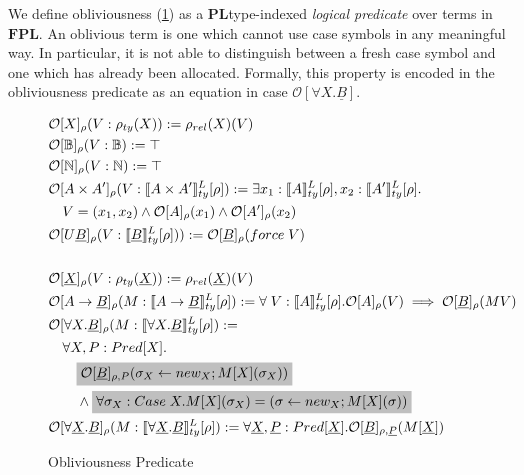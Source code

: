 \documentclass[acmsmall]{acmart}
\newcommand{\den}[1]{\llbracket #1\rrbracket}
\newcommand{\pl}{$\mathbf{PL}$}
\newcommand{\fpl}{$\mathbf{FPL}$}
\begin{document}
We define obliviousness (\cref{fig:Oblivious}) as a \pl\;type-indexed \textit{logical predicate} over terms in \fpl. An oblivious term is one which cannot use case symbols in any meaningful way. In particular, it is not able to distinguish between a fresh case symbol and one which has already been allocated. Formally, this property is encoded in the obliviousness predicate as an equation in case $\mathcal{O}[\forall X. \underline{B}]$.


\begin{figure}[H]
  \centering
  \scriptsize
  \begin{align*}
    &\mathcal{O}[X]_{\rho}(V :\rho_{ty}(X)) := \rho_{rel}(X)(V)\\
    &\mathcal{O}[\mathbb{B}]_{\rho} (V : \mathbb{B}):= \top \\%
    &\mathcal{O}[\mathbb{N}]_{\rho}(V : \mathbb{N}) := \top\\%
    &\mathcal{O}[A \times A']_{\rho}(V : \den{A\times A'}^L_{ty}[\rho]) := \exists x_1:\den{A}^L_{ty}[\rho],x_2:\den{A'}^L_{ty}[\rho].\\
    &\quad V = (x_1,x_2) \land \mathcal{O}[A]_{\rho}(x_1) \land \mathcal{O}[A']_{\rho}(x_2)\\
    &\mathcal{O}[U\underline{B}]_{\rho}(V : \den{\underline{B}}^L_{ty}[\rho] )) := \mathcal{O}[\underline{B}]_{\rho}(force\;V)\\
    \\
    & \mathcal{O}[\underline{X}]_{\rho}(V: \rho_{ty}(\underline{X})) := \rho_{rel}(\underline{X})(V)\\
    &\mathcal{O}[A\rightarrow \underline{B}]_{\rho}(M : \den{A \rightarrow \underline{B}}^L_{ty}[\rho]) := \forall\; V :\den{A}^L_{ty}[\rho]. \mathcal{O}[A]_{\rho}(V)\implies \mathcal{O}[\underline{B}]_{\rho}(MV) \\
    &\mathcal{O}[\forall X. \underline{B}]_{\rho}(M :\den{\forall X. \underline{B}}^L_{ty}[\rho]) := \\
    &\quad \forall X,P:Pred[X].\\
    &\quad \quad \colorbox{lightgray}{$\mathcal{O}[\underline{B}]_{{\rho},P}(\sigma_X\leftarrow new_X; M[X](\sigma_X))$} \\
    &\quad \quad \land \colorbox{lightgray}{$\forall \sigma_X :Case\;X.M[X](\sigma_X) = (\sigma\leftarrow new_X; M[X](\sigma))$}\\
    &\mathcal{O}[\forall \underline{X}. \underline{B}]_{\rho}(M:\den{\forall \underline{X}. \underline{B}}^L_{ty}[\rho]) := \forall \underline{X},\underline{P}: Pred[\underline{X}].\mathcal{O}[\underline{B}]_{\rho,\underline{P}}(M[\underline{X}]) 
\end{align*}
  \caption{Obliviousness Predicate}
  \label{fig:Oblivious}
\end{figure}
\end{document}
